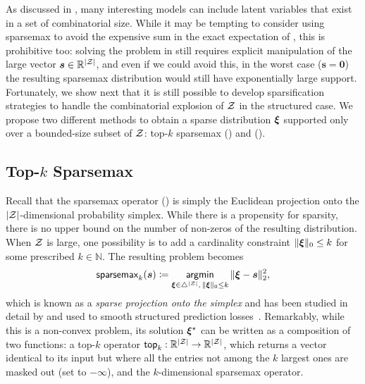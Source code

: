 \noindent As discussed in , many interesting models
can include latent variables that exist in a set of combinatorial
size. While it may be tempting to consider using sparsemax to avoid
the expensive sum in the exact expectation of , this
is prohibitive too: solving the problem in 
still requires explicit manipulation of the large vector $\bm{s} \in
    \mathbb{R}^{|\mathcal{Z}|}$, and even if we could avoid this, in the worst
case ($\bm{s}=\bm{0}$) the resulting sparsemax distribution would
still have exponentially large support. Fortunately, we show next
that it is still possible to develop sparsification strategies to
handle the combinatorial explosion of $\mathcal{Z}$ in the structured case.
We propose two different methods to obtain a sparse distribution
$\bm{\xi}$ supported only over a bounded-size subset of $\mathcal{Z}$: top-$k$
sparsemax () and \smap ().

\subsection{\label{sec:topksparse}\texorpdfstring{Top-{\boldmath $k$}}{Top-k} Sparsemax}

\noindent Recall that the sparsemax operator () is simply
the Euclidean projection onto the $|\mathcal{Z}|$-dimensional probability
simplex. While there is a propensity for sparsity, there is no upper
bound on the number of non-zeros of the resulting distribution. When
$\mathcal{Z}$ is large, one possibility is to add a cardinality constraint
$\|\bm{\xi}\|_0 \le k$ for some prescribed $k \in \mathbb{N}$. The
resulting problem becomes
%
\begin{equation}\label{eq:topk_sparsemax}
    \operatorname{\mathsf{sparsemax}_\text{$k$}}(\bm{s}) \coloneqq
    \operatorname*{\mathsf{argmin}}_{\bm{\xi} \in \triangle^{|\mathcal{Z}|}, \, \|\bm{\xi}\|_0 \le k} \| \bm{\xi} - \bm{s} \|_2^2,
\end{equation}
%
which is known as a \emph{sparse projection onto the simplex} and has
been studied in detail by \citet{kyrillidis2013sparse} and used to
smooth structured prediction
losses~\citep{NIPS2018_7726,blondel2020}. Remarkably, while this is a
non-convex problem, its solution $\bm{\xi}^\star$ can be written as a
composition of two functions: a top-$k$ operator $\operatorname{\mathsf{top}_\text{$k$}}:
    \mathbb{R}^{|\mathcal{Z}|} \rightarrow \mathbb{R}^{|\mathcal{Z}|}$, which returns a
vector identical to its input but where all the entries not among the
$k$ largest ones are masked out (set to $-\infty$), and the
$k$-dimensional sparsemax operator.

